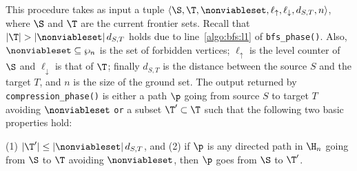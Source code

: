 This procedure takes as input a tuple
$\langle \S, \T, \nonviableset, \ell_\uparrow, \ell_\downarrow, d_{S,T}, n \rangle$,
where $\S$ and $\T$ are the current frontier sets.
Recall that $|\T|>|\nonviableset|\, d_{S,T}$ holds due to line~\ref{algo:bfs:l1} of \texttt{bfs\_phase()}.
Also, $\nonviableset\subseteq\wp_n$ is the set of forbidden vertices;
$\ell_\uparrow$ is the level counter of $\S$ and $\ell_\downarrow$ is that
of $\T$; finally $d_{S,T}$ is the distance between the source $S$ and the target $T$, and $n$ is the size of the ground set.
The output returned by \texttt{compression\_phase()} is either a path $\p$ going from source $S$ to target $T$
avoiding $\nonviableset$ \texttt{or} a subset $\T'\subset \T$ such that the following two basic properties hold:


(1) $|\T'|\leq |\nonviableset|\, d_{S,T}$, and
(2) if $\p$ is any directed path in $\H_n$ going from
$\S$ to $\T$ avoiding $\nonviableset$, then $\p$ goes from $\S$ to $\T'$.


